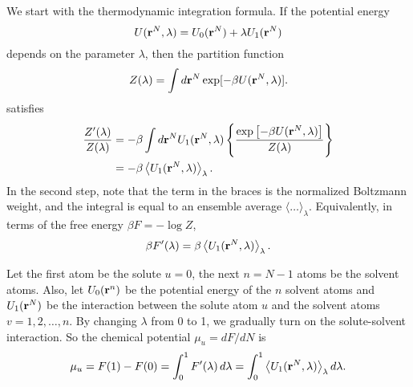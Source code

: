 \documentclass[12pt]{article}
\begin{document}
We start with the thermodynamic integration formula.
If the potential energy
\begin{equation}
  U(\mathbf{r}^N, \lambda) = U_0(\mathbf{r}^N) + \lambda U_1(\mathbf{r}^N)
  \label{eq:potene}
\end{equation}
depends on the parameter $\lambda$,
then the partition function
%
\begin{equation}
  Z(\lambda) = \int d\mathbf{r}^N \exp[-\beta U(\mathbf{r}^N, \lambda)].
  \label{eq:partfunc}
\end{equation}
%
satisfies
\begin{align*}
  \frac{ Z'(\lambda) }{Z(\lambda)}
  &=
    -\beta \int d\mathbf{r}^N U_1(\mathbf{r}^N, \lambda)
    \left\{
      \frac{ \exp
             \left[
             -\beta U(\mathbf{r}^N, \lambda)
             \right]}
      { Z(\lambda) }
    \right\} \\
  &=
    -\beta
    \left\langle
      U_1(\mathbf{r}^N, \lambda)
    \right\rangle_\lambda.
\end{align*}
In the second step, note that the term in the braces
  is the normalized Boltzmann weight,
  and the integral is equal to an ensemble average
  $\langle \dots \rangle_\lambda$.
%
Equivalently, in terms of the free energy $\beta F = -\log Z$,
\begin{equation}
  \beta F'(\lambda)
  = \beta
    \left\langle
      U_1(\mathbf{r}^N, \lambda)
    \right\rangle_\lambda.
\end{equation}

Let the first atom be the solute $u = 0$,
  the next $n = N - 1$ atoms be the solvent atoms.
Also,
  let $U_0(\mathbf{r}^n)$ be the potential energy of the $n$ solvent atoms
  and $U_1(\mathbf{r}^N)$ be the interaction between the solute atom $u$
  and the solvent atoms $v = 1, 2, \dots, n$.
By changing $\lambda$ from 0 to 1, we gradually turn on
  the solute-solvent interaction.
%
So the chemical potential $\mu_u = dF/dN$ is
\begin{align}
  \mu_u
  =
  F(1) - F(0)
  =
  \int_0^1 F'(\lambda) \, d\lambda
  =
  \int_0^1
    \left\langle
      U_1(\mathbf{r}^N, \lambda)
    \right\rangle_\lambda d\lambda.
  \label{eq:muti0}
\end{align}
\end{document}

